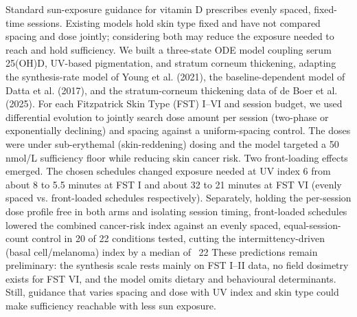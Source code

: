 Standard sun-exposure guidance for vitamin D prescribes evenly spaced, fixed-time sessions. Existing models hold skin type fixed and have not compared spacing and dose jointly; considering both may reduce the exposure needed to reach and hold sufficiency.
We built a three-state ODE model coupling serum 25(OH)D, UV-based pigmentation, and stratum corneum thickening, adapting the synthesis-rate model of Young et al. (2021), the baseline-dependent model of Datta et al. (2017), and the stratum-corneum thickening data of de Boer et al. (2025). For each Fitzpatrick Skin Type (FST) I–VI and session budget, we used differential evolution to jointly search dose amount per session (two-phase or exponentially declining) and spacing against a uniform-spacing control. The doses were under sub-erythemal (skin-reddening) dosing and the model targeted a 50 nmol/L sufficiency floor while reducing skin cancer risk.
Two front-loading effects emerged. The chosen schedules changed exposure needed at UV index 6 from about 8 to 5.5 minutes at FST I and about 32 to 21 minutes at FST VI (evenly spaced vs. front-loaded schedules respectively). Separately, holding the per-session dose profile free in both arms and isolating session timing, front-loaded schedules lowered the combined cancer-risk index against an evenly spaced, equal-session-count control in 20 of 22 conditions tested, cutting the intermittency-driven (basal cell/melanoma) index by a median of ~22%
These predictions remain preliminary: the synthesis scale rests mainly on FST I–II data, no field dosimetry exists for FST VI, and the model omits dietary and behavioural determinants. Still, guidance that varies spacing and dose with UV index and skin type could make sufficiency reachable with less sun exposure.
